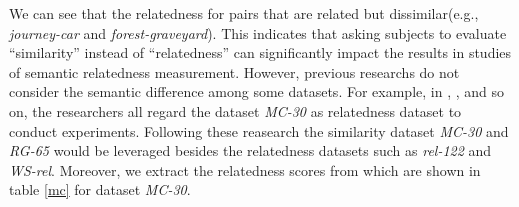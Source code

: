 \begin{table}[]
    \centering
    \caption{Relatedness vs MC-30 similarity}
    \label{mc}
    \renewcommand\arraystretch{1.2}
\end{table}
We can see that the relatedness for pairs that are related but
dissimilar(e.g., \emph{journey-car} and \emph{forest-graveyard}). 
This indicates that asking subjects to evaluate “similarity” instead of “relatedness” can
significantly impact the results in studies of semantic relatedness measurement.
However, previous researchs do not consider the semantic difference among some datasets.
For example, in \cite{ijcai/GabrilovichM07}, \cite{textgraphs/YehRMAS09}, \cite{aaai/Pirro12}
and so on, the researchers all regard the dataset \emph{MC-30} as relatedness dataset to conduct experiments.
Following these reasearch the similarity dataset \emph{MC-30} and \emph{RG-65} would be leveraged besides
the relatedness datasets such as \emph{rel-122} and \emph{WS-rel}. Moreover, we extract the relatedness
scores from \cite{acl/SzumlanskiGS13} which are shown in table \ref{mc} for dataset \emph{MC-30}.

